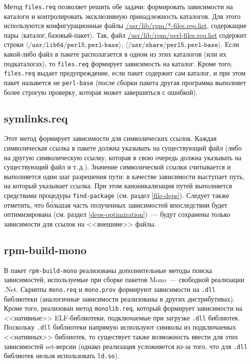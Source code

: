 \documentclass[russian,a4paper,12pt,titlepage]{article}
\begin{document}
Метод \verb|files.req| позволяет решить обе задачи: формировать зависимости на каталоги и контролировать
эксклюзивную принадлежность каталогов.  Для этого используются конфигурационные файлы \url{/usr/lib/rpm/*-files.req.list},
содержащие пары $\langle\textit{каталог},\textit{базовый-пакет}\rangle$.  Так, файл \url{/usr/lib/rpm/perl-files.req.list}
содержит строки
$\langle\texttt{/usr/lib64/perl5},\texttt{perl-base}\rangle$,
$\langle\texttt{/usr/share/perl5},\texttt{perl-base}\rangle$.
Если какой-либо файл в пакете располагается в одном из этих каталогов (или их подкаталогах),
то \verb|files.req| формирует зависимость на каталог.  Кроме того, \verb|files.req| выдает предупреждение,
если пакет содержит сам каталог, и при этом пакет назывется не \verb|perl-base| (после сборки пакета
другая программа выполняет более строгую проверку, которая может завершиться с ошибкой).

\subsection{symlinks.req}
\label{symlinks-req}
Этот метод формирует зависимости для символических ссылок.  Каждая символическая ссылка в пакете
должна указывать на существующий файл (либо на другую символическую ссылку, которая в свою очередь
должна указывать на существующий файл и т.\,д.).  Значение символической ссылки считывается и выполняется
один шаг разрешения пути: в качестве зависимости выступает путь, на который указывает ссылка.
При этом каноникализация путей выполняется средствами процедуры \verb|find-package| (см. раздел \ref{file-deps}).
Следует также отметить, что б\'{о}льшая часть полученных зависимостей впоследствии будет оптимизирована
(см. раздел \ref{deps-optimization})~--- будут сохранены только зависимости для ссылок на <<внешние>> файлы.

\subsection{rpm-build-mono}
\label{rpm-build-mono}
В пакет \verb|rpm-build-mono| реализованы дополнительные методы поиска зависимостей, используемые
при сборке пакетов Mono~--- свободной реализации .Net.  Скрипты \verb|mono.req| и \verb|mono.prov|
формируют зависимости на \verb|.dll| библиотеки (аналогичные зависимости реализованы в других дистрибутивах).
Кроме того, реализован метод \verb|monolib.req|, который формирует зависимости на <<нативные>> ELF-библиотеки,
подключаемые при загрузке \verb|.dll| библиотек.  Поскольку \verb|.dll| библиотеки напрямую используют
символы из подключаемых <<нативных>> библиотек, то существует также возможность ввести для этих зависимостей
set-версии (однако реализация усложняется из-за того, что для \verb|.dll| библиотек нельзя использовать
\verb|ld.so|).
\end{document}
